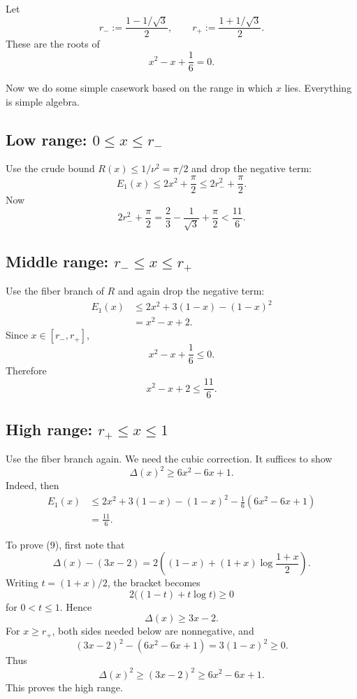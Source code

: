 \documentclass[11pt]{article}
\begin{document}
Let
\[
        r_-:=\frac{1-1/\sqrt3}{2},
        \qquad
        r_+:=\frac{1+1/\sqrt3}{2}.
\]
These are the roots of
\[
        x^2-x+\frac16=0.
\]

Now we do some simple casework based on the range in which $x$ lies. Everything is simple algebra.  

\subsection*{Low range: $0\le x\le r_-$}

Use the crude bound $R(x)\le 1/\nu^2=\pi/2$ and drop the negative term:
\[
        E_1(x)\le 2x^2+\frac\pi2
        \le 2r_-^2+\frac\pi2.
\]
Now
\[
        2r_-^2+\frac\pi2
        =\frac23-\frac1{\sqrt3}+\frac\pi2
        <\frac{11}{6}.
\]

\subsection*{Middle range: $r_-\le x\le r_+$}

Use the fiber branch of $R$ and again drop the negative term:
\begin{align*}
        E_1(x)
        &\le 2x^2+3(1-x)-(1-x)^2\\
        &=x^2-x+2.
\end{align*}
Since $x\in[r_-,r_+]$,
\[
        x^2-x+\frac16\le0.
\]
Therefore
\[
        x^2-x+2\le \frac{11}{6}.
\]

\subsection*{High range: $r_+\le x\le1$}

Use the fiber branch again.  We need the cubic correction.
It suffices to show
\begin{equation}
        \Delta(x)^2\ge 6x^2-6x+1.
        \tag{9}
\end{equation}
Indeed, then
\begin{align*}
        E_1(x)
        &\le 2x^2+3(1-x)-(1-x)^2-\frac16(6x^2-6x+1)\\
        &=\frac{11}{6}.
\end{align*}

To prove (9), first note that
\[
        \Delta(x)-(3x-2)
        =2\left((1-x)+(1+x)\log\frac{1+x}{2}\right).
\]
Writing $t=(1+x)/2$, the bracket becomes
\[
        2\bigl((1-t)+t\log t\bigr)\ge0
\]
for $0<t\le1$.  Hence
\[
        \Delta(x)\ge 3x-2.
\]
For $x\ge r_+$, both sides needed below are nonnegative, and
\[
        (3x-2)^2-(6x^2-6x+1)=3(1-x)^2\ge0.
\]
Thus
\[
        \Delta(x)^2\ge (3x-2)^2\ge 6x^2-6x+1.
\]
This proves the high range.
\end{document}
